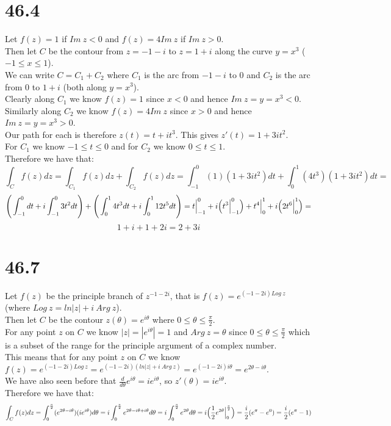 \documentclass{article}
\begin{document}
\section*{46.4}
\begin{center}
    \doublespacing
    Let $f(z) = 1$ if $Im\:z < 0$ and $f(z) = 4Im\:z$ if $Im\:z > 0$.
    \\Then let $C$ be the contour from $z = -1 - i$ to $z = 1 + i$ along the curve $y = x^3$ ($-1\leq x\leq 1$).
    \\We can write $C = C_1 + C_2$ where $C_1$ is the arc from $-1 - i$ to 0 and $C_2$ is the arc from 0 to $1 + i$ (both along $y = x^3$).
    \\Clearly along $C_1$ we know $f(z) = 1$ since $x < 0$ and hence $Im\:z = y = x^3 < 0$.
    \\Similarly along $C_2$ we know $f(z) = 4Im\:z$ since $x > 0$ and hence $Im\:z = y = x^3 > 0$.
    \\Our path for each is therefore $z(t) = t + it^3$. This gives $z'(t) = 1 + 3it^2$.
    \\For $C_1$ we know $-1\leq t\leq 0$ and for $C_2$ we know $0\leq t\leq 1$.
    \\Therefore we have that:
    \[\int _C f(z) dz =\int _{C_1} f(z) dz +\int _{C_2} f(z) dz =\int _{-1}^0 (1)(1 + 3it^2) dt +\int _0^1 (4t^3)(1 + 3it^2) dt =\]
    \[\Bigg{(}\int _{-1}^0 dt + i\int _{-1}^0 3t^2 dt\Bigg{)} +\Bigg{(}\int _0^1 4t^3 dt + i\int _0^1 12t^5 dt\Bigg{)} = t\Big{|}_{-1}^0 + i\Big{(} t^3\Big{|} _{-1}^0\Big{)} + t^4\Big{|}_0^1 + i\Big{(}2t^6\Big{|}_0^1\Big{)} =\]
    \[1 + i + 1 + 2i = 2 + 3i\] \qedsymbol
\end{center}


\section*{46.7}
\begin{center}
    \doublespacing
    Let $f(z)$ be the principle branch of $z^{-1 - 2i}$, that is $f(z) = e^{(-1 - 2i)Log\:z}$ (where $Log\:z = ln|z| + i\:Arg\:z$).
    \\Then let $C$ be the contour $z(\theta) = e^{i\theta}$ where $0\leq\theta\leq\frac{\pi}{2}$.
    \\For any point $z$ on $C$ we know $|z| = |e^{i\theta}| = 1$ and $Arg\:z =\theta$ since $0\leq\theta\leq\frac{\pi}{2}$ which is a subset of the range for the principle argument of a complex number.
    \\This means that for any point $z$ on $C$ we know $f(z) = e^{(-1 - 2i)Log\:z} = e^{(-1 - 2i)(ln|z| + i\:Arg\:z)} = e^{(-1 - 2i)i\theta} = e^{2\theta - i\theta}$.
    \\We have also seen before that $\frac{d}{d\theta} e^{i\theta} = ie^{i\theta}$, so $z'(\theta) = ie^{i\theta}$.
    \\Therefore we have that:
    \[\int _C f(z) dz =\int _0^{\frac{\pi}{2}} (e^{2\theta - i\theta})(ie^{i\theta}) d\theta = i\int _0^{\frac{\pi}{2}} e^{2\theta - i\theta + i\theta} d\theta = i\int _0^{\frac{\pi}{2}} e^{2\theta} d\theta = i\Big{(}\frac{1}{2} e^{2\theta}\Big{|}_0^{\frac{\pi}{2}}\Big{)} =\frac{i}{2} (e^{\pi} - e^0) =\frac{i}{2} (e^{\pi} - 1)\] \qedsymbol
\end{center}
\end{document}
